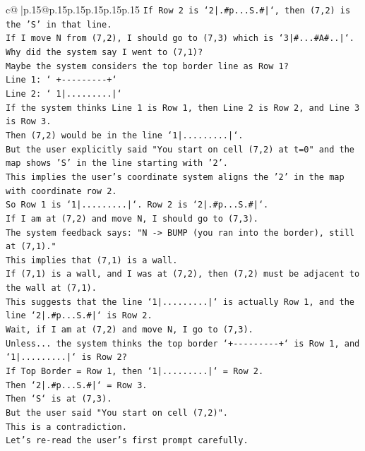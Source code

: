 \documentclass{article}
\begin{document}
{\begin{supertabular}{c@{$\;$}|p{.15\linewidth}@{}p{.15\linewidth}p{.15\linewidth}p{.15\linewidth}p{.15\linewidth}p{.15\linewidth}}
{{{\texttt{If Row 2 is `2|.\#p...S.\#|`, then (7,2) is the 'S' in that line.} \\
\texttt{If I move N from (7,2), I should go to (7,3) which is `3|\#...\#A\#..|`.} \\
\texttt{Why did the system say I went to (7,1)?} \\
\texttt{Maybe the system considers the top border line as Row 1?} \\
\texttt{Line 1: `  +{-}{-}{-}{-}{-}{-}{-}{-}{-}+`} \\
\texttt{Line 2: ` 1|.........|`} \\
\texttt{If the system thinks Line 1 is Row 1, then Line 2 is Row 2, and Line 3 is Row 3.} \\
\texttt{Then (7,2) would be in the line `1|.........|`.} \\
\texttt{But the user explicitly said "You start on cell (7,2) at t=0" and the map shows 'S' in the line starting with '2'.} \\
\texttt{This implies the user's coordinate system aligns the '2' in the map with coordinate row 2.} \\
\texttt{So Row 1 is `1|.........|`. Row 2 is `2|.\#p...S.\#|`.} \\
\texttt{If I am at (7,2) and move N, I should go to (7,3).} \\
\texttt{The system feedback says: "N {-}> BUMP (you ran into the border), still at (7,1)."} \\
\texttt{This implies that (7,1) is a wall.} \\
\texttt{If (7,1) is a wall, and I was at (7,2), then (7,2) must be adjacent to the wall at (7,1).} \\
\texttt{This suggests that the line `1|.........|` is actually Row 1, and the line `2|.\#p...S.\#|` is Row 2.} \\
\texttt{Wait, if I am at (7,2) and move N, I go to (7,3).} \\
\texttt{Unless... the system thinks the top border `+{-}{-}{-}{-}{-}{-}{-}{-}{-}+` is Row 1, and `1|.........|` is Row 2?} \\
\texttt{If Top Border = Row 1, then `1|.........|` = Row 2.} \\
\texttt{Then `2|.\#p...S.\#|` = Row 3.} \\
\texttt{Then `S` is at (7,3).} \\
\texttt{But the user said "You start on cell (7,2)".} \\
\texttt{This is a contradiction.} \\
\texttt{Let's re{-}read the user's first prompt carefully.} \\
}}}
\end{supertabular}}
\end{document}
